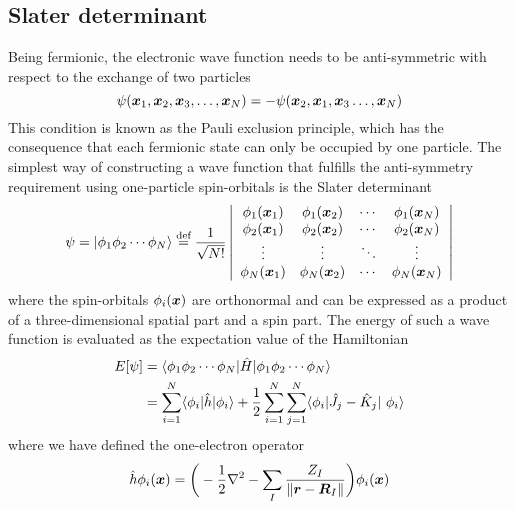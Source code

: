 \subsection{Slater determinant}
Being fermionic, the electronic wave function needs to be anti-symmetric with respect to 
the exchange of two particles
\begin{equation}
    \psi(\boldsymbol x_1,\boldsymbol x_2,\boldsymbol x_3,\dots,\boldsymbol x_N) = -
    \psi(\boldsymbol x_2,\boldsymbol x_1,\boldsymbol x_3\dots,\boldsymbol x_N)
\end{equation}
This condition is known as the Pauli exclusion principle\cite{Pauli:1925}, which has the 
consequence that each fermionic state can only be occupied by one particle. The simplest way
of constructing a wave function that fulfills the anti-symmetry requirement using one-particle
spin-orbitals is the Slater determinant\cite{Slater:1929}
\begin{equation}
    \begin{split}
    \psi = |\phi_1\phi_2\cdots\phi_N\rangle \stackrel{\text{def}}{\hbox{=}} \frac{1}{\sqrt{N!}} 
    \left|
    \begin{array}{cccc}
	\phi_1(\boldsymbol x_1)	& \phi_1(\boldsymbol x_2)	& \cdots & \phi_1(\boldsymbol x_N)\\
	\phi_2(\boldsymbol x_1)	& \phi_2(\boldsymbol x_2)	& \cdots & \phi_2(\boldsymbol x_N)\\
	\vdots			& \vdots		& \ddots & \vdots\\
	\phi_N(\boldsymbol x_1)	& \phi_N(\boldsymbol x_2)	& \cdots & \phi_N(\boldsymbol x_N)
    \end{array}
    \right|
    \end{split}
\end{equation}
where the spin-orbitals $\phi_i(\boldsymbol x)$ are orthonormal and can be expressed as a product 
of a three-dimensional spatial part and a spin part. The energy of such a wave function is 
evaluated as the expectation value of the Hamiltonian
\begin{align}
    E[\wavefunction] 
	&= \langle\orbital_1\orbital_2\cdots\orbital_N|\hat{H}|
	\orbital_1\orbital_2\cdots\orbital_N\rangle\\
    \label{eq:det_energy}
	&= \sum_{i=1}^N \langle \orbital_i |\hat{h}| \orbital_i \rangle +
	\frac{1}{2} \sum_{i=1}^N \sum_{j=1}^N
	\langle \orbital_i |\hat{J}_j-\hat{K}_j| \orbital_i\rangle
\end{align}
where we have defined the one-electron operator
\begin{equation}
    \hat{h}\phi_i(\boldsymbol x) = \bigg(-\frac{1}{2}\nabla^2 - \sum_I\frac{Z_I}{\|\boldsymbol r-\boldsymbol R_I\|}\bigg)
	\phi_i(\boldsymbol x)
\end{equation}
